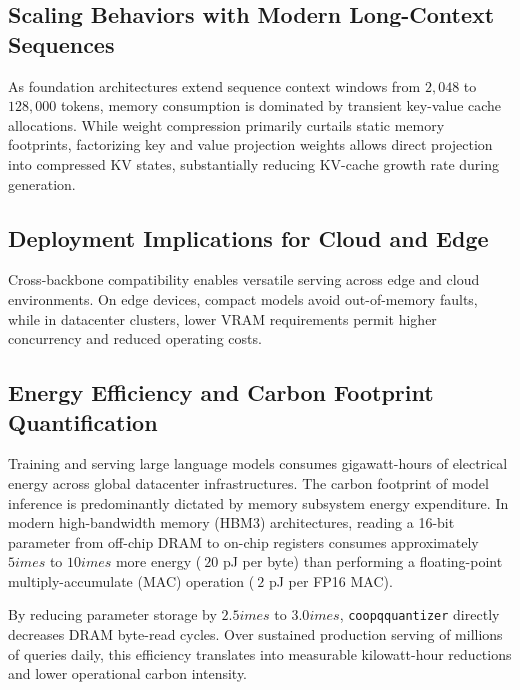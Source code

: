 \subsection{Scaling Behaviors with Modern Long-Context Sequences}
As foundation architectures extend sequence context windows from $2{,}048$ to $128{,}000$ tokens, memory consumption is dominated by transient key-value cache allocations. While weight compression primarily curtails static memory footprints, factorizing key and value projection weights allows direct projection into compressed KV states, substantially reducing KV-cache growth rate during generation.

\subsection{Deployment Implications for Cloud and Edge}
Cross-backbone compatibility enables versatile serving across edge and cloud environments. On edge devices, compact models avoid out-of-memory faults, while in datacenter clusters, lower VRAM requirements permit higher concurrency and reduced operating costs.

\subsection{Energy Efficiency and Carbon Footprint Quantification}
Training and serving large language models consumes gigawatt-hours of electrical energy across global datacenter infrastructures. The carbon footprint of model inference is predominantly dictated by memory subsystem energy expenditure. In modern high-bandwidth memory (HBM3) architectures, reading a 16-bit parameter from off-chip DRAM to on-chip registers consumes approximately $5	imes$ to $10	imes$ more energy ($~20$ pJ per byte) than performing a floating-point multiply-accumulate (MAC) operation ($~2$ pJ per FP16 MAC).

By reducing parameter storage by $2.5	imes$ to $3.0	imes$, \texttt{coopqquantizer} directly decreases DRAM byte-read cycles. Over sustained production serving of millions of queries daily, this efficiency translates into measurable kilowatt-hour reductions and lower operational carbon intensity.
